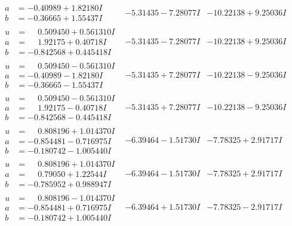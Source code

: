 \documentclass[1p]{elsarticle_modified}
\theoremstyle{definition}
\begin{document}
$$\begin{array}{c|c|c}
\begin{aligned}
a &= -0.40989 + 1.82180 I \\
b &= -0.36665 + 1.55437 I\end{aligned}
 & -5.31435 - 7.28077 I & -10.22138 + 9.25036 I \\ \hline\begin{aligned}
u &= \phantom{-}0.509450 + 0.561310 I \\
a &= \phantom{-}1.92175 + 0.40718 I \\
b &= -0.842568 + 0.445418 I\end{aligned}
 & -5.31435 - 7.28077 I & -10.22138 + 9.25036 I \\ \hline\begin{aligned}
u &= \phantom{-}0.509450 - 0.561310 I \\
a &= -0.40989 - 1.82180 I \\
b &= -0.36665 - 1.55437 I\end{aligned}
 & -5.31435 + 7.28077 I & -10.22138 - 9.25036 I \\ \hline\begin{aligned}
u &= \phantom{-}0.509450 - 0.561310 I \\
a &= \phantom{-}1.92175 - 0.40718 I \\
b &= -0.842568 - 0.445418 I\end{aligned}
 & -5.31435 + 7.28077 I & -10.22138 - 9.25036 I \\ \hline\begin{aligned}
u &= \phantom{-}0.808196 + 1.014370 I \\
a &= -0.854481 - 0.716975 I \\
b &= -0.180742 - 1.005440 I\end{aligned}
 & -6.39464 - 1.51730 I & -7.78325 + 2.91717 I \\ \hline\begin{aligned}
u &= \phantom{-}0.808196 + 1.014370 I \\
a &= \phantom{-}0.79050 + 1.22544 I \\
b &= -0.785952 + 0.988947 I\end{aligned}
 & -6.39464 - 1.51730 I & -7.78325 + 2.91717 I \\ \hline\begin{aligned}
u &= \phantom{-}0.808196 - 1.014370 I \\
a &= -0.854481 + 0.716975 I \\
b &= -0.180742 + 1.005440 I\end{aligned}
 & -6.39464 + 1.51730 I & -7.78325 - 2.91717 I \\ \hline\begin{aligned}

\end{aligned}
\end{array}$$
\end{document}
